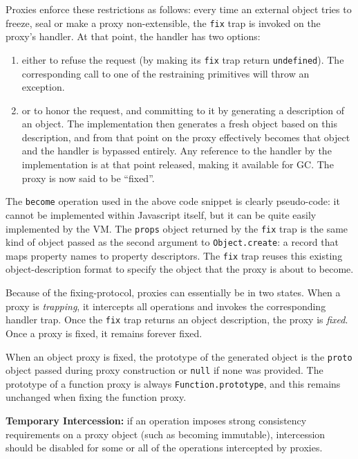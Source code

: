\documentclass{acm_proc_article-sp}
\begin{document}
Proxies enforce these restrictions as follows: every time an external object tries to freeze, seal or make a proxy non-extensible, the \texttt{fix} trap is invoked on the proxy’s handler. At that point, the handler has two options:
\begin{enumerate}
  \item either to refuse the request (by making its \texttt{fix} trap return \texttt{undefined}). The corresponding call to one of the restraining primitives will throw an exception.
  \item or to honor the request, and committing to it by generating a description of an object. The implementation then generates a fresh object based on this description, and from that point on the proxy effectively becomes that object and the handler is bypassed entirely. Any reference to the handler by the implementation is at that point released, making it available for GC. The proxy is now said to be ``fixed''.
\end{enumerate}

The \texttt{become} operation used in the above code snippet is clearly pseudo-code: it cannot be implemented within Javascript itself, but it can be quite easily implemented by the VM. The \texttt{props} object returned by the \texttt{fix} trap is the same kind of object passed as the second argument to \texttt{Object.create}: a record that maps property names to property descriptors. The \texttt{fix} trap reuses this existing object-description format to specify the object that the proxy is about to become.

Because of the fixing-protocol, proxies can essentially be in two states. When a proxy is \emph{trapping}, it intercepts all operations and invokes the corresponding handler trap. Once the \texttt{fix} trap returns an object description, the proxy is \emph{fixed}. Once a proxy is fixed, it remains forever fixed.

When an object proxy is fixed, the prototype of the generated object is the \texttt{proto} object passed during proxy construction or \texttt{null} if none was provided. The prototype of a function proxy is always \texttt{Function.prototype}, and this remains unchanged when fixing the function proxy.

\textbf{Temporary Intercession:} if an operation imposes strong consistency requirements on a proxy object (such as becoming immutable), intercession should be disabled for some or all of the operations intercepted by proxies.
\end{document}
